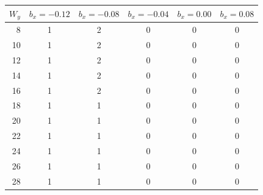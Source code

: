 \begin{tabular}{rccccc}
\toprule
 $W_y$  & $b_x=-0.12$ & $b_x=-0.08$ & $b_x=-0.04$ & $b_x=0.00$ & $b_x=0.08$ \\
\midrule
8 & 1 & 2 & 0 & 0 & 0 \\
10 & 1 & 2 & 0 & 0 & 0 \\
12 & 1 & 2 & 0 & 0 & 0 \\
14 & 1 & 2 & 0 & 0 & 0 \\
16 & 1 & 2 & 0 & 0 & 0 \\
18 & 1 & 1 & 0 & 0 & 0 \\
20 & 1 & 1 & 0 & 0 & 0 \\
22 & 1 & 1 & 0 & 0 & 0 \\
24 & 1 & 1 & 0 & 0 & 0 \\
26 & 1 & 1 & 0 & 0 & 0 \\
28 & 1 & 1 & 0 & 0 & 0 \\
\bottomrule
\end{tabular}